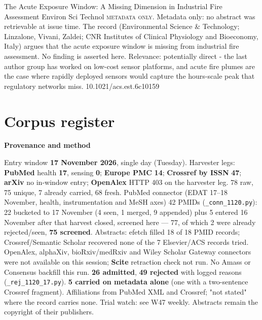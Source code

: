 \documentclass[10pt]{article}
\begin{document}
{The Acute Exposure Window: A Missing Dimension in Industrial Fire Assessment}
{Environ Sci Technol}
{\textsc{metadata only.} Metadata only: no abstract was retrievable at issue time. The record (Environmental Science \& Technology; Linzalone, Vivani, Zaldei; CNR Institutes of Clinical Physiology and Bioeconomy, Italy) argues that the acute exposure window is missing from industrial fire assessment. No finding is asserted here. Relevance: potentially direct - the last author group has worked on low-cost sensor platforms, and acute fire plumes are the case where rapidly deployed sensors would capture the hours-scale peak that regulatory networks miss.}
{10.1021/acs.est.6c10159}

\clearpage
\section*{\sffamily\bfseries\color{Deep}Corpus register}
\vspace{-1.5mm}{\color{Amber}\rule{\linewidth}{1.1pt}}\vspace{2.5mm}



\vspace{2mm}

\begin{keybox}
{\sffamily\bfseries\footnotesize\color{Deep}Provenance and method}\\[1.2mm]
{\fontsize{7.2}{8.8}\selectfont
Entry window \textbf{17 November 2026}, single day (Tuesday). Harvester legs: \textbf{PubMed} health \textbf{17}, sensing \textbf{0}; \textbf{Europe PMC} \textbf{14}; \textbf{Crossref by ISSN} \textbf{47}; \textbf{arXiv} no in-window entry; \textbf{OpenAlex} HTTP 403 on the harvester leg. 78 raw, 75 unique, 7 already carried, 68 fresh. PubMed connector (EDAT 17--18 November, health, instrumentation and MeSH axes) 42 PMIDs (\texttt{\_conn\_1120.py}): 22 bucketed to 17 November (4 seen, 1 merged, 9 appended) plus 5 entered 16 November after that harvest closed, screened here --- 77, of which 2 were already rejected/seen, \textbf{75 screened}. Abstracts: efetch filled 18 of 18 PMID records; Crossref/Semantic Scholar recovered none of the 7 Elsevier/ACS records tried.
OpenAlex, alphaXiv, bioRxiv/medRxiv and Wiley Scholar Gateway connectors were not available on this session; \textbf{Scite} retraction check not run. No Amass or Consensus backfill this run.
\textbf{26 admitted}, \textbf{49 rejected} with logged reasons (\texttt{\_rej\_1120\_17.py}). \textbf{5 carried on metadata alone} (one with a two-sentence Crossref fragment). Affiliations from PubMed XML and Crossref; "not stated" where the record carries none. Trial watch: see W47 weekly.
Abstracts remain the copyright of their publishers.\par}
\end{keybox}
\end{document}
